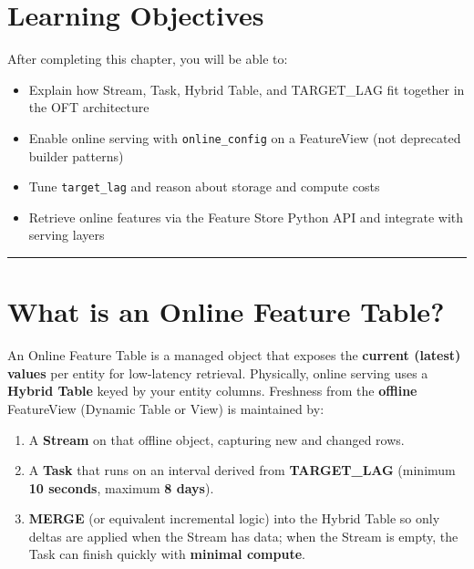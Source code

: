 \documentclass[
  letterpaper,
  DIV=11,
  numbers=noendperiod]{scrreprt}
\providecommand{\tightlist}{%
  \setlength{\itemsep}{0pt}\setlength{\parskip}{0pt}}\usepackage{longtable,booktabs,array}
\begin{document}
\hypertarget{learning-objectives-7}{%
\section{Learning Objectives}\label{learning-objectives-7}}

After completing this chapter, you will be able to:

\begin{itemize}
\tightlist
\item
  Explain how Stream, Task, Hybrid Table, and TARGET\_LAG fit together
  in the OFT architecture
\item
  Enable online serving with \texttt{online\_config} on a FeatureView
  (not deprecated builder patterns)
\item
  Tune \texttt{target\_lag} and reason about storage and compute costs
\item
  Retrieve online features via the Feature Store Python API and
  integrate with serving layers
\end{itemize}

\begin{center}\rule{0.5\linewidth}{0.5pt}\end{center}

\hypertarget{what-is-an-online-feature-table}{%
\section{What is an Online Feature
Table?}\label{what-is-an-online-feature-table}}

An Online Feature Table is a managed object that exposes the
\textbf{current (latest) values} per entity for low-latency retrieval.
Physically, online serving uses a \textbf{Hybrid Table} keyed by your
entity columns. Freshness from the \textbf{offline} FeatureView (Dynamic
Table or View) is maintained by:

\begin{enumerate}
\def\labelenumi{\arabic{enumi}.}
\tightlist
\item
  A \textbf{Stream} on that offline object, capturing new and changed
  rows.
\item
  A \textbf{Task} that runs on an interval derived from
  \textbf{TARGET\_LAG} (minimum \textbf{10 seconds}, maximum \textbf{8
  days}).
\item
  \textbf{MERGE} (or equivalent incremental logic) into the Hybrid Table
  so only deltas are applied when the Stream has data; when the Stream
  is empty, the Task can finish quickly with \textbf{minimal compute}.
\end{enumerate}
\end{document}
